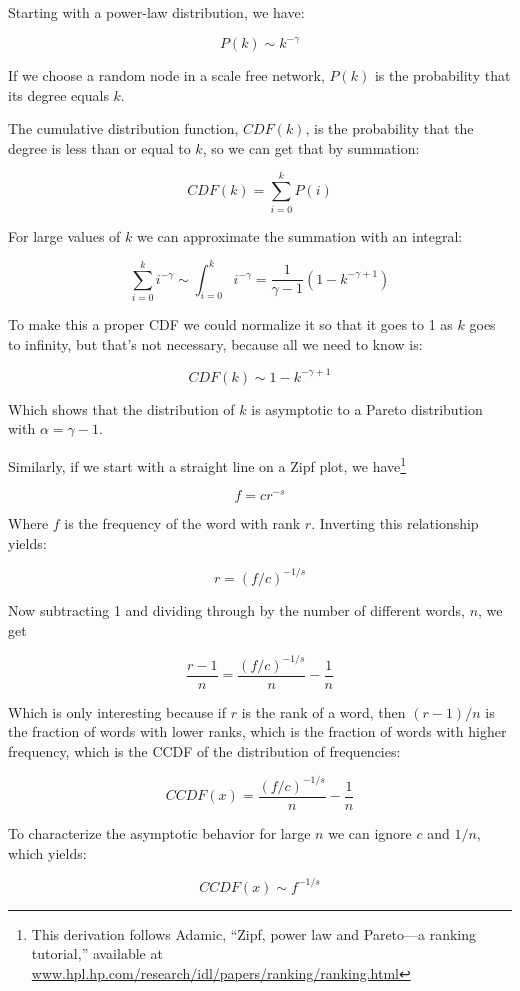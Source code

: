 \documentclass[10pt]{book}
\begin{document}
Starting with a power-law distribution, we have:

\[ P(k) \sim k^{- \gamma} \]

If we choose a random node in a scale free network,
$P(k)$ is the probability that its degree equals $k$.

The cumulative distribution function, $CDF(k)$, is the probability
that the degree is less than or equal to $k$, so we can
get that by summation:

\[ CDF(k) = \sum_{i=0}^k P(i) \]

For large values of $k$ we can approximate the summation with
an integral:

\[ \sum_{i=0}^k i^{- \gamma} \sim \int_{i=0}^k i^{- \gamma} = 
\frac{1}{\gamma -1} (1 - k^{-\gamma + 1}) \]

To make this a proper CDF we could normalize it so that it
goes to 1 as $k$ goes to infinity, but that's not necessary,
because all we need to know is:

\[ CDF(k) \sim 1 - k^{-\gamma + 1} \]

Which shows that the distribution of $k$ is asymptotic to a
Pareto distribution with $\alpha = \gamma - 1$.

Similarly, if we start with a straight line on a Zipf plot,
we have\footnote{This derivation follows
Adamic, ``Zipf, power law and
Pareto---a ranking tutorial,'' available at
\url{www.hpl.hp.com/research/idl/papers/ranking/ranking.html}}

\[ f = c r^{-s} \]

Where $f$ is the frequency of the word with rank $r$.  Inverting
this relationship yields:

\[ r = (f/c)^{-{1/s}} \]

Now subtracting 1 and dividing through by the number of different
words, $n$, we get

\[ \frac{r-1}{n} = \frac{(f/c)^{-{1/s}}}{n} - \frac{1}{n} \]

Which is only interesting because if $r$ is the rank of a word,
then $(r-1)/n$ is the fraction of words with lower ranks, which is
the fraction of words with higher frequency, which is the
CCDF of the distribution of frequencies:

\[ CCDF(x) = \frac{(f/c)^{-{1/s}}}{n} - \frac{1}{n} \]

To characterize the asymptotic behavior
for large $n$ we can ignore $c$ and $1/n$, which yields:

\[ CCDF(x) \sim f^{-{1/s}} \]
\end{document}
